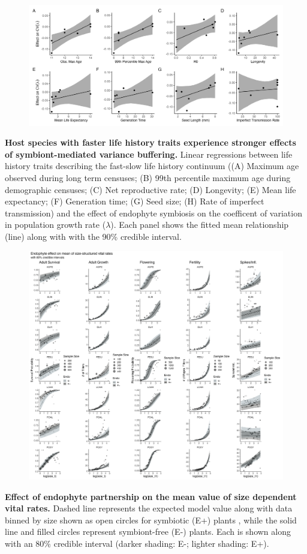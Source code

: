 \documentclass[12pt]{article}
\begin{document}
\begin{figure}
	\centering
	\includegraphics[width=\linewidth]{StochDemo_fig4.png}
\end{figure}
 \textbf{Host species with faster life history traits experience stronger effects of symbiont-mediated variance buffering.} Linear regressions between life history traits describing the fast-slow life history continuum ((A) Maximum age observed during long term censuses; (B) 99th percentile maximum age during demographic censuses; (C) Net reproductive rate; (D) Longevity; (E) Mean life expectancy; (F) Generation time; (G) Seed size; (H) Rate of imperfect transmission) and the effect of endophyte symbiosis on the coefficent of variation in population growth rate ($\lambda$). Each panel shows the fitted mean relationship (line) along with with the 90\% credible interval.
\newpage


\begin{figure}
	\centering
	\includegraphics[width=\linewidth]{figS1_meaneffect_fitplot.png}
\end{figure}
 \textbf{Effect of endophyte partnership on the mean value of size dependent vital rates.} Dashed line represents the expected model value along with data binned by size shown as open circles for symbiotic (E+) plants , while the solid line and filled circles represent symbiont-free (E-) plants. Each is shown along with an 80\% credible interval (darker shading: E-; lighter shading: E+).
\newpage
\end{document}
